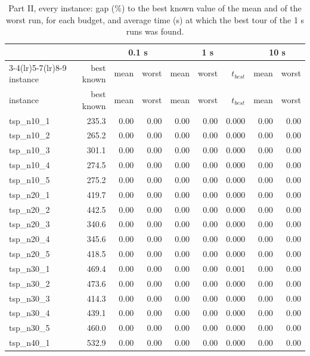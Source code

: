 \begin{longtable}{lrrrrrrrr}
\caption{Part II, every instance: gap (\%) to the best known value of the mean and of the worst run, for each budget, and average time (s) at which the best tour of the 1 s runs was found.}\label{tab:p2inst}\\
\toprule
 & & \multicolumn{2}{c}{0.1 s} & \multicolumn{3}{c}{1 s} & \multicolumn{2}{c}{10 s} \\
\cmidrule(lr){3-4}\cmidrule(lr){5-7}\cmidrule(lr){8-9}
instance & best known & mean & worst & mean & worst & $t_{best}$ & mean & worst \\
\midrule
\endfirsthead
\toprule
instance & best known & mean & worst & mean & worst & $t_{best}$ & mean & worst \\
\midrule
\endhead
tsp\_n10\_1 & 235.3 & 0.00 & 0.00 & 0.00 & 0.00 & 0.000 & 0.00 & 0.00 \\
tsp\_n10\_2 & 265.2 & 0.00 & 0.00 & 0.00 & 0.00 & 0.000 & 0.00 & 0.00 \\
tsp\_n10\_3 & 301.1 & 0.00 & 0.00 & 0.00 & 0.00 & 0.000 & 0.00 & 0.00 \\
tsp\_n10\_4 & 274.5 & 0.00 & 0.00 & 0.00 & 0.00 & 0.000 & 0.00 & 0.00 \\
tsp\_n10\_5 & 275.2 & 0.00 & 0.00 & 0.00 & 0.00 & 0.000 & 0.00 & 0.00 \\
tsp\_n20\_1 & 419.7 & 0.00 & 0.00 & 0.00 & 0.00 & 0.000 & 0.00 & 0.00 \\
tsp\_n20\_2 & 442.5 & 0.00 & 0.00 & 0.00 & 0.00 & 0.000 & 0.00 & 0.00 \\
tsp\_n20\_3 & 340.6 & 0.00 & 0.00 & 0.00 & 0.00 & 0.000 & 0.00 & 0.00 \\
tsp\_n20\_4 & 345.6 & 0.00 & 0.00 & 0.00 & 0.00 & 0.000 & 0.00 & 0.00 \\
tsp\_n20\_5 & 418.5 & 0.00 & 0.00 & 0.00 & 0.00 & 0.000 & 0.00 & 0.00 \\
tsp\_n30\_1 & 469.4 & 0.00 & 0.00 & 0.00 & 0.00 & 0.001 & 0.00 & 0.00 \\
tsp\_n30\_2 & 473.6 & 0.00 & 0.00 & 0.00 & 0.00 & 0.000 & 0.00 & 0.00 \\
tsp\_n30\_3 & 414.3 & 0.00 & 0.00 & 0.00 & 0.00 & 0.000 & 0.00 & 0.00 \\
tsp\_n30\_4 & 439.1 & 0.00 & 0.00 & 0.00 & 0.00 & 0.000 & 0.00 & 0.00 \\
tsp\_n30\_5 & 460.0 & 0.00 & 0.00 & 0.00 & 0.00 & 0.000 & 0.00 & 0.00 \\
tsp\_n40\_1 & 532.9 & 0.00 & 0.00 & 0.00 & 0.00 & 0.000 & 0.00 & 0.00 \\

\end{longtable}
